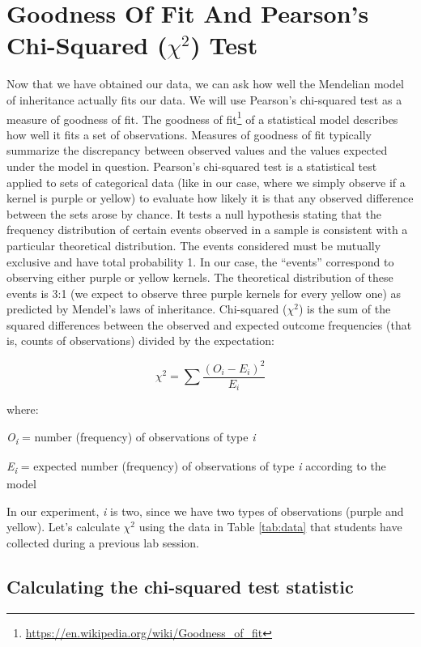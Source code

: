 \documentclass[]{book}
\let\rmarkdownfootnote\footnote%
\def\footnote{\protect\rmarkdownfootnote}
\renewcommand{\href}[2]{#2\footnote{\url{#1}}}
\theoremstyle{definition}
\theoremstyle{definition}
\theoremstyle{definition}
\theoremstyle{remark}
\begin{document}
\section{\texorpdfstring{Goodness Of Fit And Pearson's Chi-Squared
(\(\chi^2\))
Test}{Goodness Of Fit And Pearson's Chi-Squared (\textbackslash{}chi\^{}2) Test}}\label{goodness-of-fit-and-pearsons-chi-squared-chi2-test}

Now that we have obtained our data, we can ask how well the Mendelian
model of inheritance actually fits our data. We will use Pearson's
chi-squared test as a measure of goodness of fit. The
\href{https://en.wikipedia.org/wiki/Goodness_of_fit}{goodness of fit} of
a statistical model describes how well it fits a set of observations.
Measures of goodness of fit typically summarize the discrepancy between
observed values and the values expected under the model in question.
Pearson's chi-squared test is a statistical test applied to sets of
categorical data (like in our case, where we simply observe if a kernel
is purple or yellow) to evaluate how likely it is that any observed
difference between the sets arose by chance. It tests a null hypothesis
stating that the frequency distribution of certain events observed in a
sample is consistent with a particular theoretical distribution. The
events considered must be mutually exclusive and have total probability
1. In our case, the ``events'' correspond to observing either purple or
yellow kernels. The theoretical distribution of these events is 3:1 (we
expect to observe three purple kernels for every yellow one) as
predicted by Mendel's laws of inheritance. Chi-squared (\(\chi^2\)) is
the sum of the squared differences between the observed and expected
outcome frequencies (that is, counts of observations) divided by the
expectation:

\[ \chi^2=\sum\frac{(O_{i}-E_{i})^{2}}{E_{i}} \]

where:

\emph{O\textsubscript{i}} = number (frequency) of observations of type
\emph{i}

\emph{E\textsubscript{i}} = expected number (frequency) of observations
of type \emph{i} according to the model

In our experiment, \emph{i} is two, since we have two types of
observations (purple and yellow). Let's calculate \(\chi^2\) using the
data in Table \ref{tab:data} that students have collected during a
previous lab session.

\subsection{Calculating the chi-squared test
statistic}\label{calculating-the-chi-squared-test-statistic}
\end{document}
